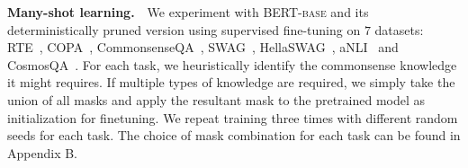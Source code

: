 \textbf{Many-shot learning.}~~We experiment with \textsc{BERT-base} and its deterministically pruned version using supervised fine-tuning on $7$ datasets: RTE~\citep{CambridgeJournals:6906264}, COPA~\citep{roemmele_choice_2011}, CommonsenseQA~\citep{talmor-etal-2019-commonsenseqa}, SWAG~\citep{zellers-etal-2018-swag}, HellaSWAG~\citep{DBLP:journals/corr/abs-1905-07830},   aNLI~\citep{DBLP:journals/corr/abs-1908-05739} and CosmosQA~\citep{huang-etal-2019-cosmos}. For each task, we heuristically identify the commonsense knowledge it might requires. If multiple types of knowledge are required, we simply take the union of all masks and apply the resultant mask to the pretrained model as initialization for finetuning. We repeat training three times with different random seeds for each task. The  choice of mask combination for each task can be found in Appendix B.

